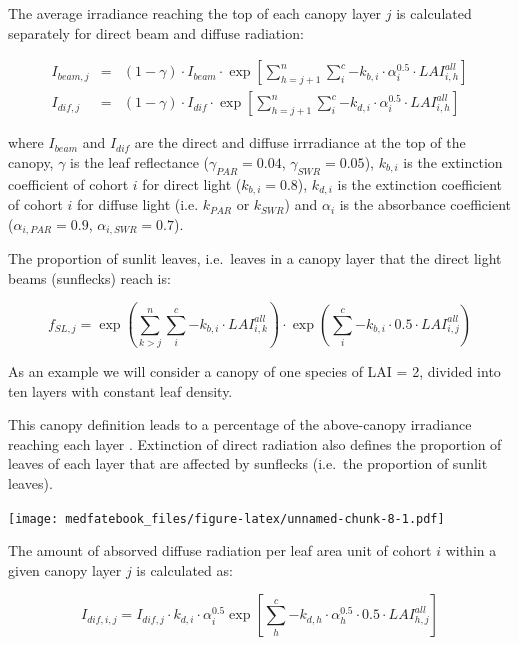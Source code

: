 \documentclass[]{book}
\begin{document}
The average irradiance reaching the top of each canopy layer \(j\) is
calculated separately for direct beam and diffuse radiation:

\begin{eqnarray}
I_{beam,j} &=& (1 - \gamma) \cdot I_{beam} \cdot \exp\left[ \sum_{h=j+1}^{n}{\sum_{i}^{c}{-k_{b,i}\cdot \alpha_i^{0.5}\cdot LAI^{all}_{i,h}}}\right]\\
I_{dif,j} &=& (1 - \gamma) \cdot I_{dif} \cdot \exp\left[ \sum_{h=j+1}^{n}{\sum_{i}^{c}{-k_{d,i}\cdot \alpha_i^{0.5}\cdot LAI^{all}_{i,h}}}\right]
\end{eqnarray}

where \(I_{beam}\) and \(I_{dif}\) are the direct and diffuse
irrradiance at the top of the canopy, \(\gamma\) is the leaf reflectance
(\(\gamma_{PAR} = 0.04\), \(\gamma_{SWR} = 0.05\)), \(k_{b,i}\) is the
extinction coefficient of cohort \(i\) for direct light
(\(k_{b,i} = 0.8\)), \(k_{d,i}\) is the extinction coefficient of cohort
\(i\) for diffuse light (i.e. \(k_{PAR}\) or \(k_{SWR}\)) and
\(\alpha_i\) is the absorbance coefficient (\(\alpha_{i,PAR} = 0.9\),
\(\alpha_{i,SWR} = 0.7\)).

The proportion of sunlit leaves, i.e.~leaves in a canopy layer that the
direct light beams (sunflecks) reach is:

\begin{equation}
f_{SL, j}  = \exp\left( \sum_{k>j}^{n}{\sum_{i}^{c}{-k_{b,i} \cdot LAI^{all}_{i,k}}}\right) \cdot \exp\left( \sum_{i}^{c}{-k_{b,i} \cdot 0.5\cdot LAI^{all}_{i,j}}\right)
\end{equation}

As an example we will consider a canopy of one species of LAI = 2,
divided into ten layers with constant leaf density.

This canopy definition leads to a percentage of the above-canopy
irradiance reaching each layer \citep{Anten2016}. Extinction of direct
radiation also defines the proportion of leaves of each layer that are
affected by sunflecks (i.e.~the proportion of sunlit leaves).

\texttt{[image: medfatebook\_files/figure-latex/unnamed-chunk-8-1.pdf]}

The amount of absorved diffuse radiation per leaf area unit of cohort
\(i\) within a given canopy layer \(j\) is calculated as:

\begin{equation}
I_{dif,i,j} = I_{dif,j} \cdot k_{d,i} \cdot \alpha_i^{0.5} \exp\left[ \sum_{h}^{c}{-k_{d,h}\cdot \alpha_h^{0.5}\cdot 0.5\cdot LAI^{all}_{h,j}}\right]
\end{equation}
\end{document}
